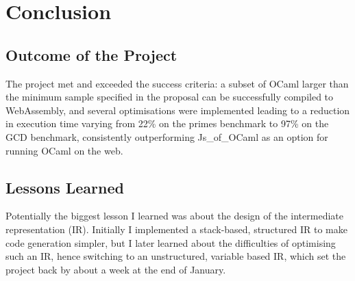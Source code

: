 \chapter{Conclusion}


\section{Outcome of the Project}
The project met and exceeded the success criteria: a subset of OCaml larger than the minimum sample specified in the proposal can be successfully compiled to WebAssembly, and several optimisations were implemented leading to a reduction in execution time varying from 22\% on the primes benchmark to 97\% on the GCD benchmark, consistently outperforming Js\_of\_OCaml as an option for running OCaml on the web.

\section{Lessons Learned}
Potentially the biggest lesson I learned was about the design of the intermediate representation (IR). Initially I implemented a stack-based, structured IR to make code generation simpler, but I later learned about the difficulties of optimising such an IR, hence switching to an unstructured, variable based IR, which set the project back by about a week at the end of January.

